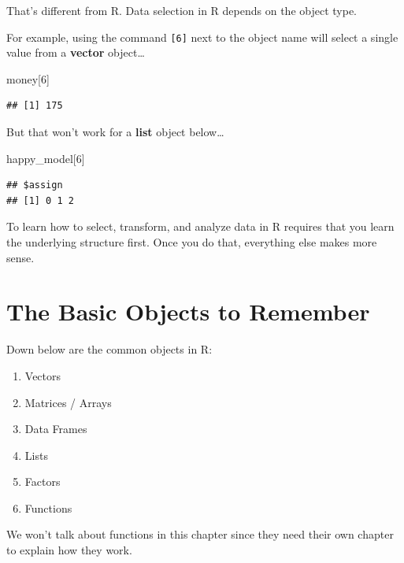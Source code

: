 \documentclass[
]{book}
\newenvironment{Shaded}{\begin{snugshade}}{\end{snugshade}}
\newcommand{\DecValTok}[1]{\textcolor[rgb]{0.00,0.00,0.81}{#1}}
\newcommand{\NormalTok}[1]{#1}
\providecommand{\tightlist}{%
  \setlength{\itemsep}{0pt}\setlength{\parskip}{0pt}}
\begin{document}
That's different from R. Data selection in R depends on the object type.

For example, using the command \texttt{{[}6{]}} next to the object name will select a single value from a \textbf{vector} object\ldots{}

\begin{Shaded}
\begin{Highlighting}[]
\NormalTok{money[}\DecValTok{6}\NormalTok{]}
\end{Highlighting}
\end{Shaded}

\begin{verbatim}
## [1] 175
\end{verbatim}

But that won't work for a \textbf{list} object below\ldots{}

\begin{Shaded}
\begin{Highlighting}[]
\NormalTok{happy_model[}\DecValTok{6}\NormalTok{]}
\end{Highlighting}
\end{Shaded}

\begin{verbatim}
## $assign
## [1] 0 1 2
\end{verbatim}

To learn how to select, transform, and analyze data in R requires that you learn the underlying structure first. Once you do that, everything else makes more sense.

\hypertarget{the-basic-objects-to-remember}{%
\section{The Basic Objects to Remember}\label{the-basic-objects-to-remember}}

Down below are the common objects in R:

\begin{enumerate}
\def\labelenumi{\arabic{enumi}.}
\tightlist
\item
  Vectors
\item
  Matrices / Arrays
\item
  Data Frames
\item
  Lists
\item
  Factors
\item
  Functions
\end{enumerate}

We won't talk about functions in this chapter since they need their own chapter to explain how they work.
\end{document}
